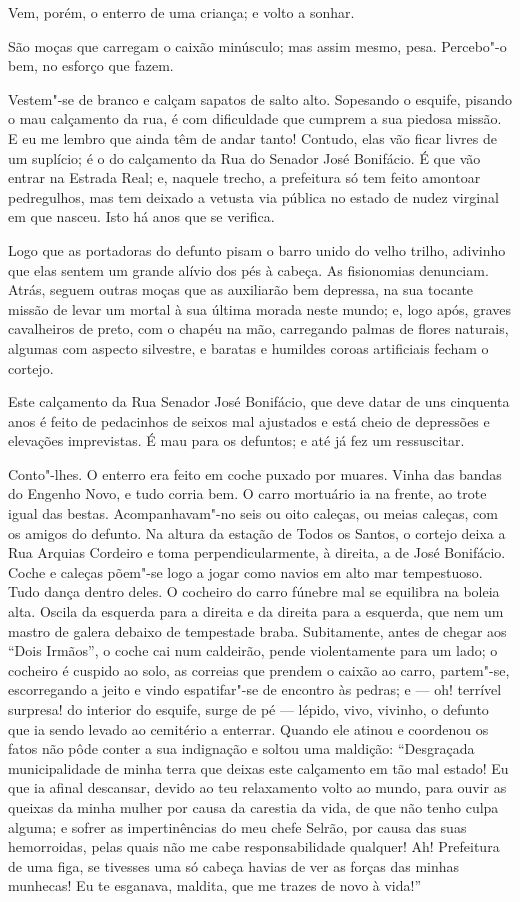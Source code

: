 Vem, porém, o enterro de uma criança; e volto a sonhar.

São moças que carregam o caixão minúsculo; mas assim mesmo, pesa.
Percebo"-o bem, no esforço que fazem.

Vestem"-se de branco e calçam sapatos de salto alto. Sopesando o esquife,
pisando o mau calçamento da rua, é com dificuldade que cumprem a sua
piedosa missão. E eu me lembro que ainda têm de andar tanto! Contudo,
elas vão ficar livres de um suplício; é o do calçamento da Rua do
Senador José Bonifácio. É que vão entrar na Estrada Real; e, naquele
trecho, a prefeitura só tem feito amontoar pedregulhos, mas tem deixado
a vetusta via pública no estado de nudez virginal em que nasceu. Isto há
anos que se verifica.

Logo que as portadoras do defunto pisam o barro unido do velho trilho,
adivinho que elas sentem um grande alívio dos pés à cabeça. As
fisionomias denunciam. Atrás, seguem outras moças que as auxiliarão bem
depressa, na sua tocante missão de levar um mortal à sua última morada
neste mundo; e, logo após, graves cavalheiros de preto, com o chapéu na
mão, carregando palmas de flores naturais, algumas com aspecto
silvestre, e baratas e humildes coroas artificiais fecham o cortejo.

Este calçamento da Rua Senador José Bonifácio, que deve datar de uns
cinquenta anos é feito de pedacinhos de seixos mal ajustados e está
cheio de depressões e elevações imprevistas. É mau para os defuntos; e
até já fez um ressuscitar.

Conto"-lhes. O enterro era feito em coche puxado por muares. Vinha das
bandas do Engenho Novo, e tudo corria bem. O carro mortuário ia na
frente, ao trote igual das bestas. Acompanhavam"-no seis ou oito caleças,
ou meias caleças, com os amigos do defunto. Na altura da estação de
Todos os Santos, o cortejo deixa a Rua Arquias Cordeiro e toma
perpendicularmente, à direita, a de José Bonifácio. Coche e caleças
põem"-se logo a jogar como navios em alto mar tempestuoso. Tudo dança
dentro deles. O cocheiro do carro fúnebre mal se equilibra na boleia
alta. Oscila da esquerda para a direita e da direita para a esquerda,
que nem um mastro de galera debaixo de tempestade braba. Subitamente,
antes de chegar aos ``Dois Irmãos'', o coche cai num caldeirão, pende
violentamente para um lado; o cocheiro é cuspido ao solo, as correias
que prendem o caixão ao carro, partem"-se, escorregando a jeito e vindo
espatifar"-se de encontro às pedras; e --- oh! terrível surpresa! do
interior do esquife, surge de pé --- lépido, vivo, vivinho, o defunto que
ia sendo levado ao cemitério a enterrar. Quando ele atinou e coordenou
os fatos não pôde conter a sua indignação e soltou uma maldição:
``Desgraçada municipalidade de minha terra que deixas este calçamento em
tão mal estado! Eu que ia afinal descansar, devido ao teu relaxamento
volto ao mundo, para ouvir as queixas da minha mulher por causa da
carestia da vida, de que não tenho culpa alguma; e sofrer as
impertinências do meu chefe Selrão, por causa das suas hemorroidas,
pelas quais não me cabe responsabilidade qualquer! Ah! Prefeitura de uma
figa, se tivesses uma só cabeça havias de ver as forças das minhas
munhecas! Eu te esganava, maldita, que me trazes de novo à vida!''

